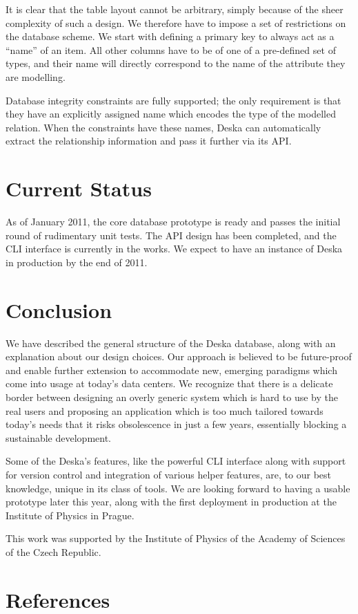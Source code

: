 \documentclass[a4paper]{jpconf}
\begin{document}
It is clear that the table layout cannot be arbitrary, simply because of the sheer complexity of such a design.  We therefore have to
impose a set of restrictions on the database scheme.  We start with defining a primary key to always act as a ``name'' of an item.  All
other columns have to be of one of a pre-defined set of types, and their name will directly correspond to the name of the attribute
they are modelling.

Database integrity constraints are fully supported; the only requirement is that they have an explicitly assigned name which encodes
the type of the modelled relation.  When the constraints have these names, Deska can automatically extract the relationship information
and pass it further via its API.

\section{Current Status}

As of January 2011, the core database prototype is ready and passes the initial round of rudimentary unit tests.  The API design has
been completed, and the CLI interface is currently in the works. We expect to have an instance of Deska in production by the end of
2011.

\section{Conclusion}

We have described the general structure of the Deska database, along with an explanation about our design choices.  Our approach is
believed to be future-proof and enable further extension to accommodate new, emerging paradigms which come into usage at today's data
centers.  We recognize that there is a delicate border between designing an overly generic system which is hard to use by the real
users and proposing an application which is too much tailored towards today's needs that it risks obsolescence in just a few years,
essentially blocking a sustainable development.

Some of the Deska's features, like the powerful CLI interface along with support for version control and integration of various helper
features, are, to our best knowledge, unique in its class of tools.  We are looking forward to having a usable prototype later this
year, along with the first deployment in production at the Institute of Physics in Prague.

\ack
This work was supported by the Institute of Physics of the Academy of Sciences of the Czech Republic.

\section*{References}


\end{document}
